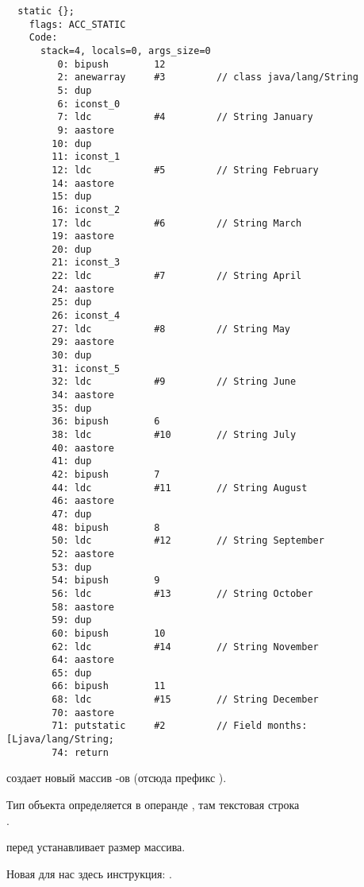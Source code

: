 \begin{lstlisting}
  static {};
    flags: ACC_STATIC
    Code:
      stack=4, locals=0, args_size=0
         0: bipush        12
         2: anewarray     #3         // class java/lang/String
         5: dup           
         6: iconst_0      
         7: ldc           #4         // String January
         9: aastore       
        10: dup           
        11: iconst_1      
        12: ldc           #5         // String February
        14: aastore       
        15: dup           
        16: iconst_2      
        17: ldc           #6         // String March
        19: aastore       
        20: dup           
        21: iconst_3      
        22: ldc           #7         // String April
        24: aastore       
        25: dup           
        26: iconst_4      
        27: ldc           #8         // String May
        29: aastore       
        30: dup           
        31: iconst_5      
        32: ldc           #9         // String June
        34: aastore       
        35: dup           
        36: bipush        6
        38: ldc           #10        // String July
        40: aastore       
        41: dup           
        42: bipush        7
        44: ldc           #11        // String August
        46: aastore       
        47: dup           
        48: bipush        8
        50: ldc           #12        // String September
        52: aastore       
        53: dup           
        54: bipush        9
        56: ldc           #13        // String October
        58: aastore       
        59: dup           
        60: bipush        10
        62: ldc           #14        // String November
        64: aastore       
        65: dup           
        66: bipush        11
        68: ldc           #15        // String December
        70: aastore       
        71: putstatic     #2         // Field months:[Ljava/lang/String;
        74: return        
\end{lstlisting}


 создает новый массив -ов (отсюда префикс ).

Тип объекта определяется в операнде , там текстовая строка \\
.

 перед  устанавливает размер массива.

Новая для нас здесь инструкция: .


